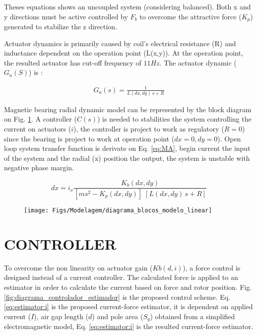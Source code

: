 \documentclass[10pt,fleqn,a4paper,twoside]{article}
\begin{document}
	Theses equations shows an uncoupled system (considering balanced). Both x and y directions must be active controlled by $F_b$ to overcome the attractive force ($K_p$) generated to stabilize the z direction. 
		
	Actuator dynamics is primarily caused by coil's electrical resistance (R) and inductance dependent on the operation point (L(x,y)). At the operation point, the resulted actuator has cut-off frequency of $11Hz$. The actuator dynamic ($G_a(S)$) is :
	
	\begin{align}
		G_a(s) = \frac{1}{L(dx,dy) \, s + R} 
	\end{align}
	
	Magnetic bearing radial dynamic model can be represented by the block diagram on Fig. \ref{fig:diagrama_blocos_modelo_linear}. A controller ($C(s)$) is needed to stabilities the system controlling the current on actuators ($i$), the controller is project to work as regulatory ($R=0$) since the bearing is project to work at  operation point ($dx=0, dy=0$).	Open loop system transfer function is derivate on Eq. \ref{eq:MA}, begin current the input of the system and the radial (x) position the output, the system is unstable with negative phase margin. 
	
	\begin{equation}
	dx = i_x \frac{K_b(dx,dy)}{[m s^2 - K_p (dx,dy)] \; [L(dx,dy) \, s + R] } 
	\label{eq:MA}
	\end{equation}
	
	\begin{figure}[!ht]
	\centering
	\texttt{[image: Figs/Modelagem/diagrama\_blocos\_modelo\_linear]}
	\label{fig:diagrama_blocos_modelo_linear}
	\end{figure}	
	

	
	\section{\uppercase{CONTROLLER}}
	
	To overcome the non linearity on actuator gain ($Kb(d,i)$), a force control is designed instead of a current controller. The calculated force is applied to an estimator in order to calculate the current based on force and rotor position. Fig. \ref{fig:diagrama_controlador_estimador} is the proposed control scheme. Eq. \ref{eq:estimator:i} is the proposed current-force estimator, it is dependent on applied current ($I$), air gap length ($d$) and pole area  ($S_g$) obtained from a simplified electromagnetic model, Eq. \ref{eq:estimator:i} is the resulted current-force estimator.
		
\end{document}
